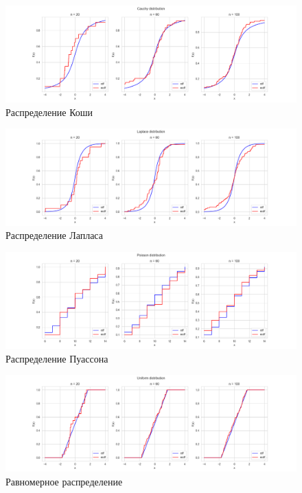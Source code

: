 \documentclass[a4paper,14pt]{article}
\begin{document}
	\begin{figure}[H]
		\centering
		\includegraphics[scale=0.35]{../image/lab4/lab4_ecdf_cauchy.png}
		\caption{Распределение Коши}
	\end{figure}
	
	\begin{figure}[H]
		\centering
		\includegraphics[scale=0.35]{../image/lab4/lab4_ecdf_laplace.png}
		\caption{Распределение Лапласа}
	\end{figure}
	
	\begin{figure}[H]
		\centering
		\includegraphics[scale=0.35]{../image/lab4/lab4_ecdf_poisson.png}
		\caption{Распределение Пуассона}
	\end{figure}
	
	\begin{figure}[H]
		\centering
		\includegraphics[scale=0.35]{../image/lab4/lab4_ecdf_uniform.png}
		\caption{Равномерное распределение}
	\end{figure}
\end{document}
